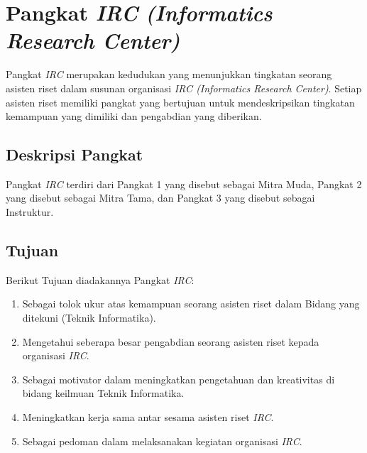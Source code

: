 \chapter{Pangkat \textit{IRC} \textit{(Informatics Research Center)}}
\par
Pangkat \textit{IRC} merupakan kedudukan yang menunjukkan tingkatan seorang asisten riset dalam susunan organisasi \textit{IRC (Informatics Research Center)}. Setiap asisten riset memiliki pangkat yang bertujuan untuk mendeskripsikan tingkatan kemampuan yang dimiliki dan pengabdian yang diberikan. 

\section{Deskripsi Pangkat}
Pangkat \textit{IRC} terdiri dari Pangkat 1 yang disebut sebagai Mitra Muda, Pangkat 2 yang disebut sebagai Mitra Tama, dan Pangkat 3 yang disebut sebagai Instruktur.

\section{Tujuan}
Berikut Tujuan diadakannya Pangkat \textit{IRC}:
\begin{enumerate}
 \item Sebagai tolok ukur atas kemampuan seorang asisten riset dalam Bidang yang ditekuni (Teknik Informatika).
 \item Mengetahui seberapa besar pengabdian seorang asisten riset kepada organisasi \textit{IRC}.
 \item Sebagai motivator dalam meningkatkan pengetahuan dan kreativitas di bidang keilmuan Teknik Informatika.
 \item Meningkatkan kerja sama antar sesama asisten riset \textit{IRC}.
 \item Sebagai pedoman dalam melaksanakan kegiatan organisasi \textit{IRC}.
\end{enumerate}
